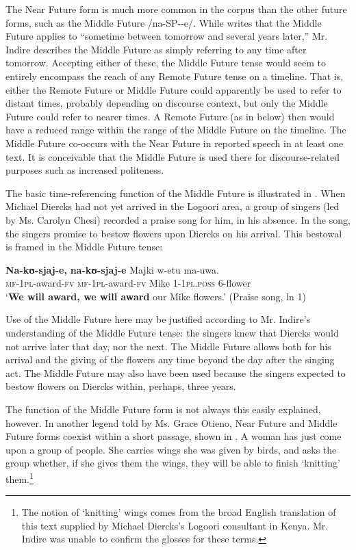 \documentclass[output=paper]{langsci/langscibook}
\begin{document}
The Near Future form is much more common in the corpus than the other future forms, such as the Middle Future /na-SP-{\longrule}-e/. While \citet[285]{Leung1991} writes that the Middle Future applies to “sometime between tomorrow and several years later,” Mr. Indire describes the Middle Future as simply referring to any time after tomorrow. Accepting either of these, the Middle Future tense would seem to entirely encompass the reach of any Remote Future tense on a timeline. That is, either the Remote Future or Middle Future could apparently be used to refer to distant times, probably depending on discourse context, but only the Middle Future could refer to nearer times. A Remote Future (as in  below) then would have a reduced range within the range of the Middle Future on the timeline. %
%
The Middle Future co-occurs with the Near Future in reported speech in at least one text. It is conceivable that the Middle Future is used there for discourse-related purposes such as increased politeness. 

The basic time-referencing function of the Middle Future is illustrated in . When Michael Diercks had not yet arrived in the Logoori area, a group of singers (led by Ms. Carolyn Chesi) recorded a praise song for him, in his absence. In the song, the singers promise to bestow flowers upon Diercks on his arrival. This bestowal is framed in the Middle Future tense:

\ea\label{ex:sarvasy:12}
\gll \textbf{Na-kʊ-sjaj-e,}    \textbf{na-kʊ-sjaj-e}    Majki  w-etu    ma-uwa. \\
\textsc{mf-1pl}-award-\textsc{fv}  \textsc{mf-1pl-}award-\textsc{fv}  Mike  1-\textsc{1pl.poss}  6-flower \\
\glt ‘\textbf{We will award, we will award} our Mike flowers.’ (Praise song, ln 1)
\z

Use of the Middle Future here may be justified according to Mr. Indire’s understanding of the Middle Future tense: the singers knew that Diercks would not arrive later that day, nor the next. The Middle Future allows both for his arrival and the giving of the flowers any time beyond the day after the singing act. The Middle Future may also have been used because the singers expected to bestow flowers on Diercks within, perhaps, three years. 

The function of the Middle Future form is not always this easily explained, however. In another legend told by Ms. Grace Otieno, Near Future and Middle Future forms coexist within a short passage, shown in . A woman has just come upon a group of people. She carries wings she was given by birds, and asks the group whether, if she gives them the wings, they will be able to finish ‘knitting’ them.\footnote{The notion of ‘knitting’ wings comes from the broad English translation of this text supplied by Michael Diercks’s Logoori consultant in Kenya. Mr. Indire was unable to confirm the glosses for these terms.}
\end{document}
